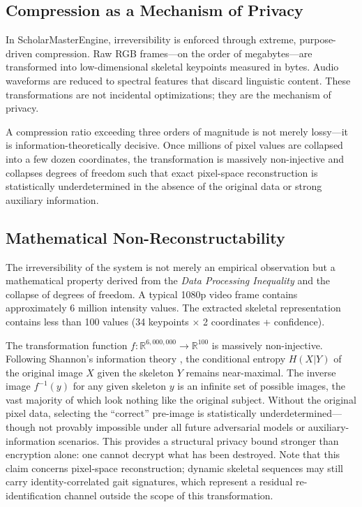 \documentclass[conference]{IEEEtran}
\begin{document}
\subsection{Compression as a Mechanism of Privacy}
In ScholarMasterEngine, irreversibility is enforced through extreme, purpose-driven compression. Raw RGB frames---on the order of megabytes---are transformed into low-dimensional skeletal keypoints measured in bytes. Audio waveforms are reduced to spectral features that discard linguistic content. These transformations are not incidental optimizations; they are the mechanism of privacy.

A compression ratio exceeding three orders of magnitude is not merely lossy---it is information-theoretically decisive. Once millions of pixel values are collapsed into a few dozen coordinates, the transformation is massively non-injective and collapses degrees of freedom such that exact pixel-space reconstruction is statistically underdetermined in the absence of the original data or strong auxiliary information. 

\subsection{Mathematical Non-Reconstructability}
The irreversibility of the system is not merely an empirical observation but a mathematical property derived from the \textit{Data Processing Inequality} \cite{b43} and the collapse of degrees of freedom. A typical 1080p video frame contains approximately 6 million intensity values. The extracted skeletal representation contains less than 100 values (34 keypoints $\times$ 2 coordinates + confidence).

The transformation function $f: \mathbb{R}^{6,000,000} \rightarrow \mathbb{R}^{100}$ is massively non-injective. Following Shannon's information theory \cite{b44}, the conditional entropy $H(X|Y)$ of the original image $X$ given the skeleton $Y$ remains near-maximal. The inverse image $f^{-1}(y)$ for any given skeleton $y$ is an infinite set of possible images, the vast majority of which look nothing like the original subject. Without the original pixel data, selecting the ``correct'' pre-image is statistically underdetermined---though not provably impossible under all future adversarial models or auxiliary-information scenarios. This provides a structural privacy bound stronger than encryption alone: one cannot decrypt what has been destroyed. Note that this claim concerns pixel-space reconstruction; dynamic skeletal sequences may still carry identity-correlated gait signatures, which represent a residual re-identification channel outside the scope of this transformation.
\end{document}
